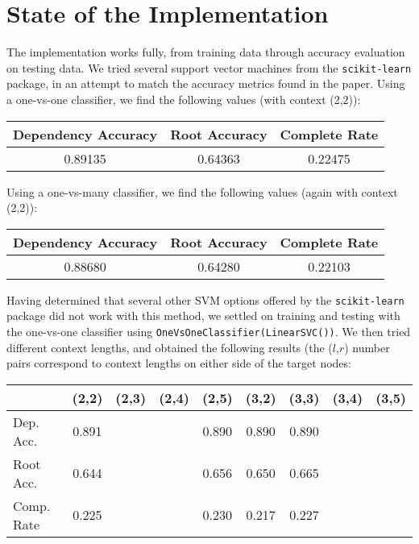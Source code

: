\documentclass[12pt,fleqn]{article}
\begin{document}
    \section*{State of the Implementation}
    The implementation works fully, from training data through accuracy evaluation on testing data. We tried several support vector machines from the \texttt{scikit-learn} package, in an attempt to match the accuracy metrics found in the paper. Using a one-vs-one classifier, we find the following values (with context (2,2)):
    \begin{center}
        \begin{tabular}{|c|c|c|}
            \hline Dependency Accuracy & Root Accuracy & Complete Rate \\ \hline
            0.89135 & 0.64363 & 0.22475 \\ \hline
        \end{tabular}
    \end{center}
    Using a one-vs-many classifier, we find the following values (again with context (2,2)):
    \begin{center}
        \begin{tabular}{|c|c|c|}
            \hline Dependency Accuracy & Root Accuracy & Complete Rate \\ \hline
            0.88680 & 0.64280 & 0.22103 \\ \hline
        \end{tabular}
    \end{center}
    Having determined that several other SVM options offered by the \texttt{scikit-learn} package did not work with this method, we settled on training and testing with the one-vs-one classifier using \texttt{OneVsOneClassifier(LinearSVC())}. We then tried different context lengths, and obtained the following results (the ($l$,$r$) number pairs correspond to context lengths on either side of the target nodes:
    \begin{center}
        \begin{tabular}{|l|cccc|cccc|}
            \cline{2-9} \multicolumn{1}{c|}{} & (2,2) & (2,3) & (2,4) & (2,5) & (3,2) & (3,3) & (3,4) & (3,5) \\ \hline
            Dep. Acc. & 0.891 &&& 0.890 & 0.890 & 0.890 && \\
            Root Acc. & 0.644 &&& 0.656 & 0.650 & 0.665 && \\
            Comp. Rate & 0.225 &&& 0.230 & 0.217 & 0.227 && \\ \hline
        \end{tabular}
    \end{center}
\end{document}
